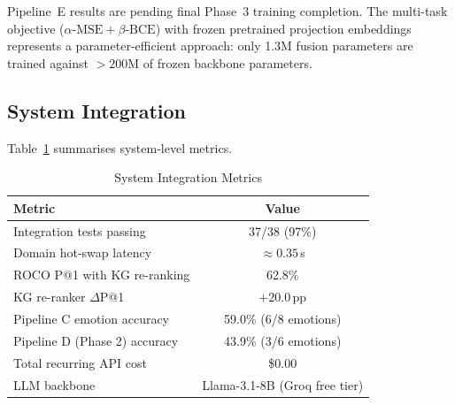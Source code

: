 \documentclass[10pt,conference]{IEEEtran}
\theoremstyle{ieeethm}
\theoremstyle{ieeedef}
\theoremstyle{ieeeremark}
\begin{document}
\begin{table}[!t]
\centering
\caption{CMU-MOSI Sentiment Results}
\label{tab:sentiment}
\end{table}

Pipeline~E results are pending final Phase~3 training completion. The multi-task objective ($\alpha\text{-MSE} + \beta\text{-BCE}$) with frozen pretrained projection embeddings represents a parameter-efficient approach: only 1.3M fusion parameters are trained against $>200$M of frozen backbone parameters.

\subsection{System Integration}

Table~\ref{tab:integration} summarises system-level metrics.

\begin{table}[!t]
\centering
\caption{System Integration Metrics}
\label{tab:integration}
\begin{tabular}{@{}lc@{}}
\toprule
\textbf{Metric} & \textbf{Value} \\
\midrule
Integration tests passing         & 37/38 (97\%) \\
Domain hot-swap latency           & $\approx 0.35$\,s \\
ROCO P@1 with KG re-ranking       & 62.8\% \\
KG re-ranker $\Delta$P@1          & $+20.0$\,pp \\
Pipeline C emotion accuracy       & 59.0\% (6/8 emotions) \\
Pipeline D (Phase 2) accuracy     & 43.9\% (3/6 emotions) \\
Total recurring API cost          & \$0.00 \\
LLM backbone                      & Llama-3.1-8B (Groq free tier) \\
\bottomrule
\end{tabular}
\end{table}
\end{document}
